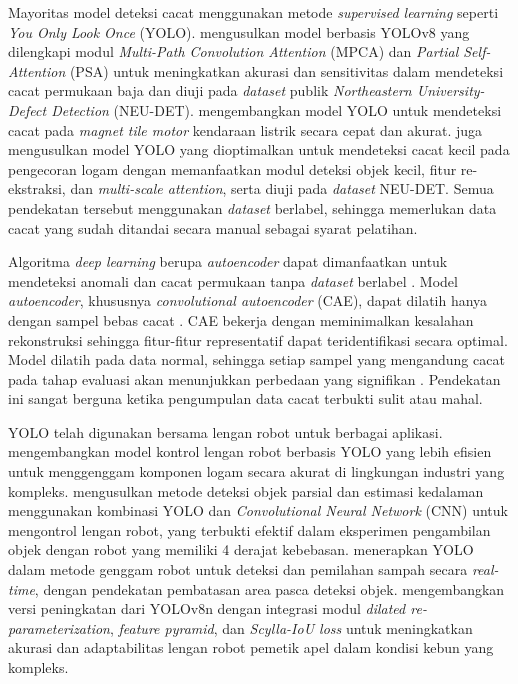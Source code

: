 Mayoritas model deteksi cacat menggunakan metode \textit{supervised
learning} seperti \textit{You Only Look Once} (YOLO). \citet{29}
mengusulkan model berbasis YOLOv8 yang dilengkapi modul
\textit{Multi-Path Convolution Attention} (MPCA) dan \textit{Partial
Self-Attention} (PSA) untuk meningkatkan akurasi dan sensitivitas
dalam mendeteksi cacat permukaan baja dan diuji pada
\textit{dataset} publik \textit{Northeastern University-Defect Detection}
(NEU-DET). \citet{30} mengembangkan model YOLO untuk mendeteksi cacat
pada \textit{magnet tile motor} kendaraan listrik secara cepat dan
akurat. \citet{31} juga mengusulkan model YOLO yang dioptimalkan
untuk mendeteksi cacat kecil pada pengecoran logam dengan
memanfaatkan modul deteksi objek kecil, fitur re-ekstraksi, dan
\textit{multi-scale attention}, serta diuji pada \textit{dataset}
NEU-DET. Semua pendekatan tersebut menggunakan \textit{dataset}
berlabel, sehingga memerlukan data cacat yang sudah ditandai secara
manual sebagai syarat pelatihan.

Algoritma \textit{deep learning} berupa \textit{autoencoder} dapat
dimanfaatkan untuk mendeteksi anomali dan cacat permukaan tanpa
\textit{dataset} berlabel \citep{7}.
Model \textit{autoencoder}, khususnya \textit{convolutional
autoencoder} (CAE), dapat dilatih hanya dengan sampel bebas cacat
\citep{8}. CAE bekerja dengan meminimalkan kesalahan rekonstruksi
sehingga fitur-fitur representatif dapat teridentifikasi secara
optimal. Model dilatih pada data normal, sehingga setiap sampel yang
mengandung cacat pada tahap evaluasi akan menunjukkan perbedaan yang
signifikan \citep{9}. Pendekatan ini sangat berguna ketika
pengumpulan data cacat terbukti sulit atau mahal.

YOLO telah digunakan bersama lengan robot untuk berbagai aplikasi.
\citet{10} mengembangkan model kontrol
lengan robot berbasis YOLO yang lebih efisien untuk menggenggam
komponen logam secara akurat di lingkungan industri yang kompleks.
\citet{11} mengusulkan metode deteksi objek
parsial dan estimasi kedalaman menggunakan kombinasi YOLO dan
\textit{Convolutional Neural Network} (CNN)
untuk mengontrol lengan robot, yang terbukti efektif dalam eksperimen
pengambilan objek dengan robot yang memiliki 4 derajat kebebasan.
\citet{12} menerapkan YOLO dalam
metode genggam robot untuk deteksi dan
pemilahan sampah secara \textit{real-time}, dengan pendekatan pembatasan area
pasca deteksi objek. \citet{13} mengembangkan versi
peningkatan dari YOLOv8n dengan integrasi modul \textit{dilated
re-parameterization}, \textit{feature pyramid}, dan
\textit{Scylla-IoU loss} untuk
meningkatkan akurasi dan adaptabilitas lengan robot pemetik apel
dalam kondisi kebun yang kompleks.

